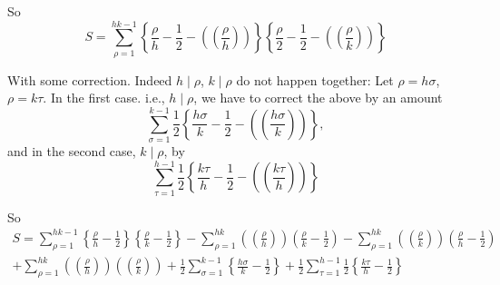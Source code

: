 So\pageoriginale
$$
S= \sum^{hk-1}_{\rho=1}\left\{ \frac{\rho}{h} - \frac{1}{2} - \left(
\left( \frac{\rho}{h}\right)\right)\right\} \left\{ \frac{\rho}{2} -
\frac{1}{2}-\left( \left( \frac{\rho}{k}\right)\right)\right\}
$$

With some correction. Indeed $h\mid \rho$, $k\mid\rho$ do not happen
together: Let $\rho = h \sigma$, $\rho = k \tau$. In the first
case. i.e., $h\mid \rho$, we have to correct the above by an amount
$$
\sum^{k-1}_{\sigma=1} \frac{1}{2} \left\{ \frac{h \sigma}{k} -
\frac{1}{2} - \left( \left(\frac{h \sigma}{k}\right)\right)\right\},
$$
and in the second case, $k\mid \rho$, by
$$
\sum^{h-1}_{\tau=1} \frac{1}{2} \left\{\frac{k \tau}{h}- \frac{1}{2} 
- \left(\left( \frac{k \tau}{h}\right)\right)\right\}
$$

So
\begin{multline*}
  S= \sum^{hk-1}_{\rho=1} \left\{ \frac{\rho}{h} - \frac{1}{2}\right\}
  \left\{ \frac{\rho}{k} - \frac{1}{2}\right\} - \sum^{hk}_{\rho=1}
  \left( \left(\frac{\rho}{h}\right)\right)\left(\frac{\rho}{k} -
  \frac{1}{2}  \right)- \sum^{hk}_{\rho=1} \left(
  \left(\frac{\rho}{k}\right)\right) \left( \frac{\rho}{h} -
  \frac{1}{2}\right)\\
  + \sum^{hk}_{\rho=1} \left( \left(\frac{\rho}{h}\right)\right)
  \left( \left(\frac{\rho}{k}\right)\right)+ \frac{1}{2}
  \sum^{k-1}_{\sigma=1} \left\{ \frac{h \sigma}{k} -
  \frac{1}{2}\right\}+ \frac{1}{2} \sum^{h-1}_{\tau=1} \frac{1}{2}
  \left\{ \frac{k \tau}{h} - \frac{1}{2}\right\}   
\end{multline*}

